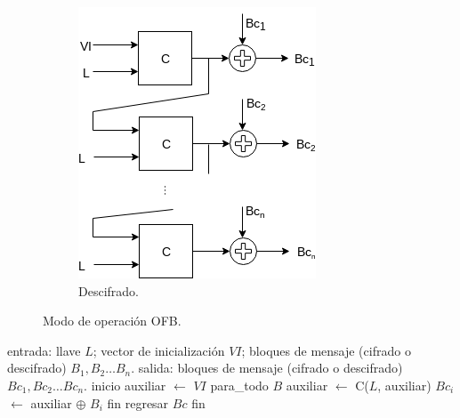 \begin{figure}[H]
\begin{subfigure}{0.45\textwidth}
\begin{center}
          \includegraphics[width=0.7\linewidth]
            {contenidos/antecedentes/modos/diagramas/modo_ofb_inverso.png}
          \caption{Descifrado.}
      \end{center}
  \end{subfigure}
  \caption{Modo de operación OFB.}
\end{figure}

\begin{pseudocodigo}[caption={Modo de operación OFB (cifrado y descifrado).}]
  entrada: llave $ L $; vector de inicialización $ VI $;
           bloques de mensaje (cifrado o descifrado) $ B_1, B_2 \dots B_n $.
   salida: bloques de mensaje (cifrado o descifrado) $ Bc_1, Bc_2 \dots Bc_n $.
  inicio
    auxiliar $\gets$ $ VI $
    para_todo $B$
      auxiliar $\gets$ C($L$, auxiliar)
      $Bc_i$ $\gets$  auxiliar $\oplus$ $B_i$
    fin
    regresar $Bc$
  fin
\end{pseudocodigo}
